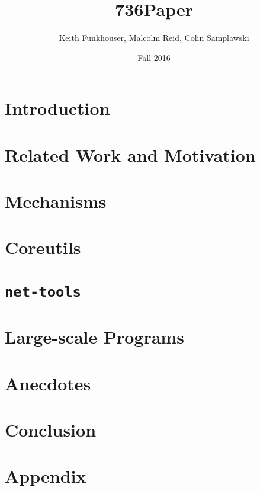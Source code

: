 \documentclass[10pt]{article}
\title{736Paper}
\author{Keith Funkhouser, Malcolm Reid, Colin Samplawski}
\date{Fall 2016}
\begin{document}
\setlength{\baselineskip}{18pt}
\maketitle

\section{Introduction}


\section{Related Work and Motivation}



\section{Mechanisms}




\section{Coreutils}


\section{\texttt{net-tools}}


\section{Large-scale Programs}


\section{Anecdotes}


\section{Conclusion}

\section*{Appendix}



\end{document}
